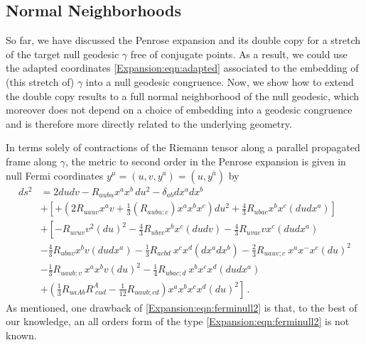 \subsection{Normal Neighborhoods} \label{Expansion:sec:normalneighborhoods}

So far, we have discussed the Penrose expansion and its double copy for a stretch of the target null geodesic $\gamma$ free of conjugate points. As a result, we could use the adapted coordinates \eqref{Expansion:eqn:adapted} associated to the embedding of (this stretch of) $\gamma$ into a null geodesic congruence. Now, we show how to extend the double copy results to a full normal neighborhood of the null geodesic, which moreover does not depend on a choice of embedding into a geodesic congruence and is therefore more directly related to the underlying geometry. 

In terms solely of contractions of the Riemann tensor along a parallel propagated frame along $\gamma$, the metric to second order in the Penrose expansion is given in null Fermi coordinates $y^{\mu} = (u,v,y^{a}) = (u, y^{\bar{a}})$ by \cite{Blau:2006ar}
\begin{equation}\label{Expansion:eqn:ferminull2}
\begin{aligned}
ds^2 &= 2du dv-R_{a u b u}x^a x^b \, du^2 - \delta_{ab}dx^a dx^b \\
&+ \left\lbrack +\left(2 R_{u a u v}x^a v + \frac{1}{3} (R_{a u b u;c})  x^a x^b x^c \right) du^2 +\frac{4}{3} R_{u b a c}x^b x^c (du dx^a)\right\rbrack  \\
&+ \left[-R_{uvuv}v^2 (du)^2 
-\frac{4}{3} R_{ubvc} x^b x^c (du dv) -\frac{4}{3} R_{uvac}  v
x^c (du dx^a)\right. \\
& -\frac{4}{3} R_{ubav}x^b v (du dx^a)
-\frac{1}{3} R_{acbd} \ x^c x^d (dx^a dx^b) 
-\frac{2}{3} R_{uauv;c} \ x^a x^- x^c (du)^2 \\
& -\frac{1}{3} R_{uaub;v} \ x^a x^b v (du)^2  
-\frac{1}{4} R_{ubac;d} \ x^b x^c x^d (du dx^a) \\
&\left.+(\frac{1}{3} R_{uaAb} R^A_{\;cud} - \frac{1}{12} R_{uaub;cd})  x^a x^b
x^c x^d (du)^2\right] \, .
\end{aligned}
\end{equation}
As mentioned, one drawback of \eqref{Expansion:eqn:ferminull2} is that, to the best of our knowledge, an all orders form of the type \eqref{Expansion:eqn:ferminull2}  is not known.

